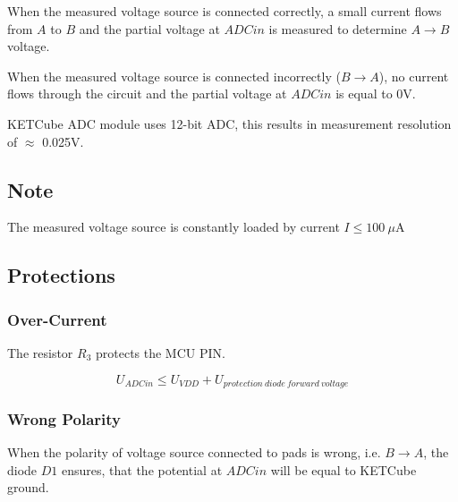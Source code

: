 \documentclass[twoside,a4paper]{refart}
\begin{document}
  When the measured voltage source is connected correctly, a small current flows from $A$ to $B$ and the partial voltage at $ADCin$ is measured to determine $A \rightarrow B$ voltage.

  When the measured voltage source is connected incorrectly ($B \rightarrow A$), no current flows through the circuit and the partial voltage at $ADCin$ is equal to 0V.
  
  KETCube ADC module uses 12-bit ADC, this results in measurement resolution of $\approx$ 0.025V.

\subsection*{Note}
  The measured voltage source is constantly loaded by current $I \leq 100 ~\mu$A
  
\subsection{Protections}
\subsubsection*{Over-Current}
  The resistor $R_3$ protects the MCU PIN.

\begin{equation}
  U_{ADCin} \leq U_{VDD} + U_{protection~diode~forward~voltage}
\end{equation}
  
\subsubsection*{Wrong Polarity}

When the polarity of voltage source connected to pads is wrong, i.e. $B \rightarrow A$, the diode $D1$ ensures, that the potential at $ADCin$ will be equal to KETCube ground.

\clearpage
\end{document}
